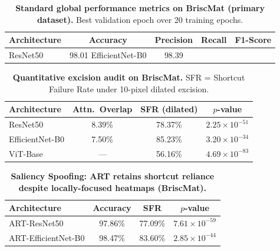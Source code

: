 
\begin{table}[h]
\centering
\caption{\textbf{Standard global performance metrics on BriscMat (primary
dataset).} Best validation epoch over 20 training epochs.}
\label{tab:briscmat_global}
\begin{tabular}{lcccc}
\toprule
\textbf{Architecture} & \textbf{Accuracy} & \textbf{Precision} &
  \textbf{Recall} & \textbf{F1-Score} \\
\midrule
  ResNet50 & 98.01%
  EfficientNet-B0 & 98.39%
\bottomrule
\end{tabular}
\end{table}


\begin{table}[h]
\centering
\caption{\textbf{Quantitative excision audit on BriscMat.}
SFR = Shortcut Failure Rate under 10-pixel dilated excision.}
\label{tab:briscmat_audit}
\begin{tabular}{lccc}
\toprule
\textbf{Architecture} & \textbf{Attn.\ Overlap} &
  \textbf{SFR (dilated)} & \textbf{$p$-value} \\
\midrule
  ResNet50        & 8.39\% & 78.37\% & $2.25\times10^{-51}$ \\
  EfficientNet-B0 & 7.50\% & 85.23\% & $3.20\times10^{-34}$ \\
  ViT-Base        & —         & 56.16\% & $4.69\times10^{-83}$ \\
\bottomrule
\end{tabular}
\end{table}


\begin{table}[h]
\centering
\caption{\textbf{Saliency Spoofing: ART retains shortcut reliance despite
locally-focused heatmaps (BriscMat).}}
\label{tab:art}
\begin{tabular}{lccc}
\toprule
\textbf{Architecture} & \textbf{Accuracy} & \textbf{SFR} & \textbf{$p$-value} \\
\midrule
  ART-ResNet50        & 97.86\% & 77.09\% & $7.61\times10^{-59}$ \\
  ART-EfficientNet-B0 & 98.47\% & 83.60\% & $2.85\times10^{-44}$ \\
\bottomrule
\end{tabular}
\end{table}


